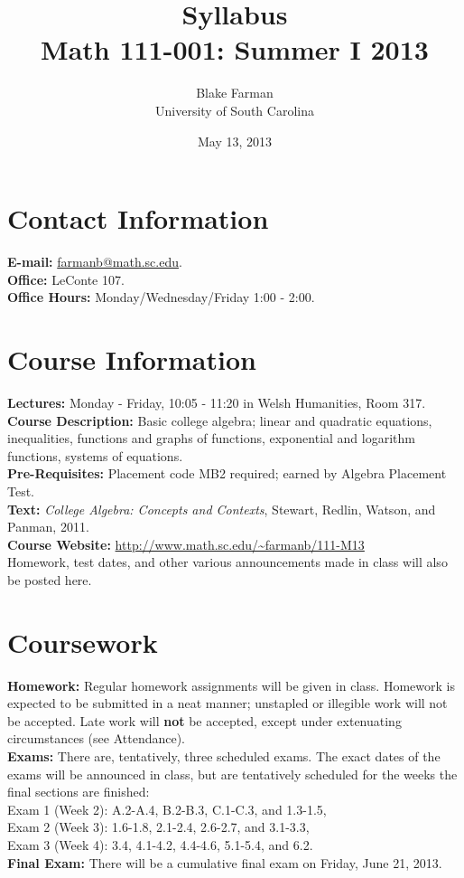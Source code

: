 \documentclass[10pt]{amsart}
\author{Blake Farman\\University of South Carolina}
\title{Syllabus\\Math 111-001: Summer I 2013}
\date{May 13, 2013}
\begin{document}
\maketitle

\section*{Contact Information}
\noindent
    {\bf E-mail:} \href{mailto:farmanb@math.sc.edu}{farmanb@math.sc.edu}.\\
    {\bf Office:} LeConte 107.\\
    {\bf Office Hours:} Monday/Wednesday/Friday 1:00 - 2:00.\\

    \section*{Course Information}
    \noindent
        {\bf Lectures:} Monday - Friday, 10:05 - 11:20 in Welsh Humanities, Room 317.\\
        {\bf Course Description:} Basic college algebra; linear and quadratic equations, inequalities, functions and graphs of functions, exponential and logarithm functions, systems of equations.\\
        {\bf Pre-Requisites:} Placement code MB2 required; earned by Algebra Placement Test.\\
        {\bf Text:} {\it College Algebra: Concepts and Contexts}, Stewart, Redlin, Watson, and Panman, 2011.\\
        {\bf Course Website:} \url{http://www.math.sc.edu/~farmanb/111-M13}\\
        \indent
        Homework, test dates, and other various announcements made in class will also be posted here.\\
        
        \section*{Coursework}
        \noindent
            {\bf Homework:} Regular homework assignments will be given in class.
            Homework is expected to be submitted in a neat manner; unstapled or illegible work will not be accepted.
            Late work will {\bf not} be accepted, except under extenuating circumstances (see Attendance).\\
            {\bf Exams:} There are, tentatively, three scheduled exams.
            The exact dates of the exams will be announced in class, but are tentatively scheduled for the weeks the final sections are finished:\\
            \indent 
            Exam 1 (Week 2): A.2-A.4, B.2-B.3, C.1-C.3, and 1.3-1.5,\\
            \indent
            Exam 2 (Week 3): 1.6-1.8, 2.1-2.4, 2.6-2.7, and 3.1-3.3,\\
            \indent
            Exam 3 (Week 4): 3.4, 4.1-4.2, 4.4-4.6, 5.1-5.4, and 6.2.\\
            {\bf Final Exam:} There will be a cumulative final exam on Friday, June 21, 2013.\\
\end{document}
